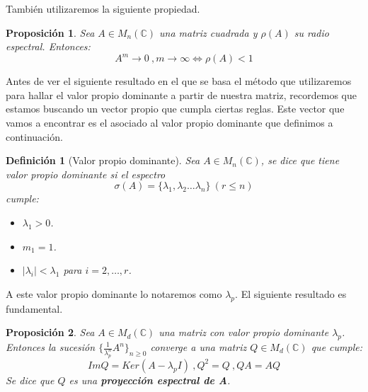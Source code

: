 \documentclass[size=a4, parskip=half, titlepage=false, toc=flat, toc=bib, 12pt]{scrartcl}
\theoremstyle{theorem-style}
\newtheorem{nprop}{Proposición}[section]
\theoremstyle{definition-style}
\newtheorem{ndef}{Definición}[section]
\theoremstyle{remark-style}
\theoremstyle{example-style}
\theoremstyle{definition-style}
\theoremstyle{remark-style}
\begin{document}
También utilizaremos la siguiente propiedad.

\begin{nprop}
\label{res1}
Sea $A \in M_n(\mathbb{C})$ una matriz cuadrada y $\rho(A)$ su radio espectral. Entonces:
$$A^m \rightarrow 0 \ ,  m \rightarrow \infty \Leftrightarrow \rho(A) < 1 $$
\end{nprop}

Antes de ver el siguiente resultado en el que se basa el método que utilizaremos para hallar el valor propio dominante a partir de nuestra matriz, recordemos que estamos buscando un vector propio que cumpla ciertas reglas. Este vector que vamos a encontrar es el asociado al valor propio dominante que definimos a continuación.

\begin{ndef}[Valor propio dominante]
Sea $A \in M_n(\mathbb{C})$, se dice que tiene valor propio dominante si el espectro
$$\sigma (A) = \{ \lambda_1, \lambda_2 \dots \lambda_n \} \   (r \leq n)$$
cumple:
\begin{itemize}
\item $\lambda_1 > 0$.
\item $m_1 = 1$.
\item $|\lambda_i| < \lambda_1$ para $i = 2, \dots , r$.
\end{itemize}
\end{ndef}
A este valor propio dominante lo notaremos como $\lambda_p$. El siguiente resultado es fundamental.

\begin{nprop} Sea $A \in M_d(\mathbb{C})$ una matriz con valor propio dominante $\lambda_p$. Entonces la sucesión $\{\frac{1}{ \lambda_p^n } A^n \}_{n\geq 0}$ converge a una matriz $Q \in M_d(\mathbb{C})$ que cumple:
$$ImQ = Ker ( A - \lambda_p I) \ , Q^2 = Q \ , QA = AQ $$
Se dice que $Q$ es una \textbf{proyección espectral de A}.
\label{converge}
\end{nprop}
\end{document}
